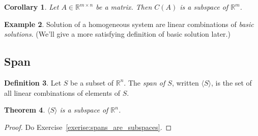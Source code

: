 \documentclass[fullpage]{amsart}
\newcommand{\RR}{\mathbb{R}}
\newtheorem{theorem}{Theorem}[section]
\newtheorem{corollary}[theorem]{Corollary}
\theoremstyle{definition}
\newtheorem{definition}[theorem]{Definition}
\newtheorem{example}[theorem]{Example}
\begin{document}
\begin{corollary}
  Let $A\in\RR^{m\times n}$ be a matrix. Then $C(A)$ is a subspace of $\RR^m$.
\end{corollary}

\begin{example}
  Solution of a homogeneous system are linear combinations of \emph{basic solutions}.
  (We'll give a more satisfying definition of basic solution later.)
\end{example}

\subsection{Span}

\begin{definition}
  Let $S$ be a subset of $\RR^n$. The \emph{span of $S$}, written $\langle S\rangle$, is the set of all linear combinations of elements of $S$.
\end{definition}

\begin{theorem}\label{theorem:spans_are_subspaces}
  $\langle S\rangle$ is a subspace of $\RR^n$.
\end{theorem}

\begin{proof}
  Do Exercise~\ref{exerise:spans_are_subspaces}.
\end{proof}


\end{document}
